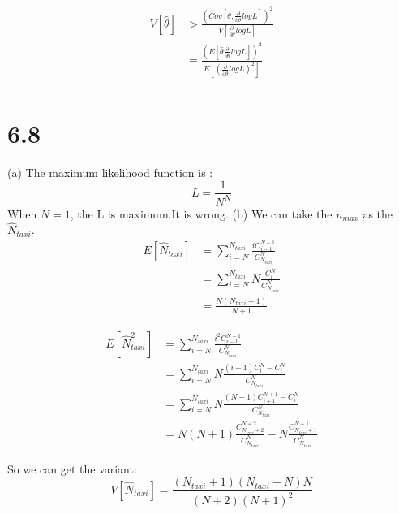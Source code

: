 \documentclass{article}
\begin{document}
\begin{CJK*}{GBK}{song}
\begin{equation}
 \end{equation}
 
 \begin{equation}
 \begin{aligned}
 V[\hat{\theta}]&>\frac{(Cov[\hat{\theta},\frac{\partial}{\partial \theta }logL])^2}{V[\frac{\partial}{\partial \theta }logL]}\\
 &=\frac{(E[\hat{\theta}\frac{\partial}{\partial \theta }logL])^2}{E[(\frac{\partial}{\partial \theta }logL)^2]}\\
 \end{aligned}
 \end{equation}
 
 
 
 
 
 
 
 \section{6.8}
 (a)
 The maximum likelihood function is : 
 \begin{equation}
 L=\frac{1}{N^N}
 \end{equation}
 When $N=1$, the L is maximum.It is wrong.
 (b)
 We can take the $n_{max}$ as the $\hat{N}_{taxi}$.
 \begin{equation}
 \begin{aligned}
 E[\hat{N}_{taxi}]&=\sum_{i=N}^{N_{taxi}}\frac{iC_{i-1}^{N-1}}{C_{N_{taxi}}^N}\\
 &=\sum_{i=N}^{N_{taxi}}N\frac{C_{i}^{N}}{C_{N_{taxi}}^N}\\
 &=\frac{N(N_{taxi}+1)}{N+1}
 \end{aligned}
 \end{equation}
 
 \begin{equation}
 \begin{aligned}
E[\hat{N}_{taxi}^2]&=\sum_{i=N}^{N_{taxi}}\frac{i^2C_{i-1}^{N-1}}{C_{N_{taxi}}^N}\\
&=\sum_{i=N}^{N_{taxi}}N\frac{(i+1)C_{i}^{N}-C_{i}^{N}}{C_{N_{taxi}}^N}\\
&=\sum_{i=N}^{N_{taxi}}N\frac{(N+1)C_{i+1}^{N+1}-C_{i}^{N}}{C_{N_{taxi}}^N}\\
&=N(N+1)\frac{C^{N+2}_{N_{taxi}+2}}{C_{N_{taxi}}^N}-N\frac{C^{N+1}_{N_{taxi}+1}}{C_{N_{taxi}}^N}
 \end{aligned}
 \end{equation}
 
 So we can get the variant:
 \begin{equation}
 V[\hat{N}_{taxi}]=\frac{(N_{taxi}+1)(N_{taxi}-N)N}{(N+2)(N+1)^2}
 \end{equation}
 

\end{CJK*}
\end{document}
